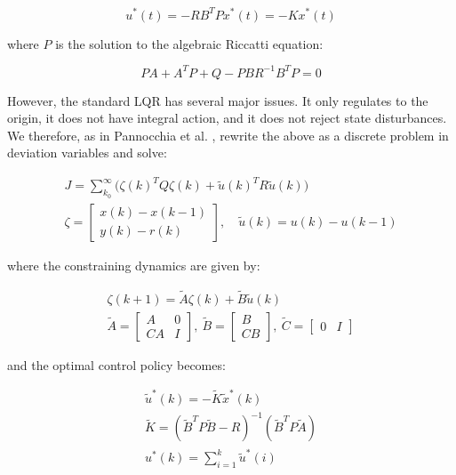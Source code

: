 \begin{equation}\label{eq:LQRSolution}
	u^*(t) = -RB^TPx^*(t) = -Kx^*(t)
\end{equation}

where $P$ is the solution to the algebraic Riccatti equation:

\begin{equation}\label{eq:ARE}
	PA + A^TP + Q - PBR^{-1}B^TP = 0
\end{equation}

However, the standard LQR has several major issues. It only regulates to the origin, it does not have integral action, and it does not reject state disturbances. We therefore, as in Pannocchia et al. \cite{Pannocchia2015a}, rewrite the above as a discrete problem in deviation variables and solve:

\begin{equation}\label{eq:LagrangeProblemDeviation}
	\begin{gathered}
	J = \sum_{k_0}^{\infty} \big(\zeta(k)^TQ\zeta(k) + \tilde{u}(k)^TR\tilde{u}(k)\big) \\
	\zeta = \begin{bmatrix}	x(k)-x(k-1) \\ y(k)-r(k) \end{bmatrix}, \quad \tilde{u}(k) = u(k)-u(k-1) 
	\end{gathered}
\end{equation} 

where the constraining dynamics are given by:

\begin{equation}\label{eq:VelocityMatrices}
	\begin{gathered}
		\zeta(k+1) = \tilde{A}\zeta(k) + \tilde{B}\tilde{u}(k) \\
		\tilde{A} = \begin{bmatrix} A & 0 \\ CA & I	\end{bmatrix}, \ 
		\tilde{B} = \begin{bmatrix} B \\ CB	\end{bmatrix}, \ \tilde{C} = \begin{bmatrix} 0 & I	\end{bmatrix}
	\end{gathered}
\end{equation}

and the optimal control policy becomes:

\begin{equation}\label{eq:OptimalVF-LQRPolicy}
\begin{gathered}
\tilde{u}^*(k)  = -\tilde{K}\tilde{x}^*(k) \\
\tilde{K} = (\tilde{B}^TP\tilde{B}-R)^{-1}(\tilde{B}^TP\tilde{A}) \\
u^*(k) = \sum_{i=1}^{k} \tilde{u}^*(i)
\end{gathered}
\end{equation}

